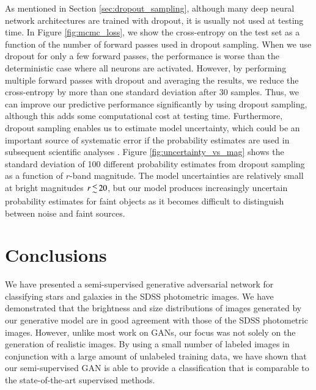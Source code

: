 \documentclass[fleqn,usenatbib]{mnras}
\begin{document}
As mentioned in Section \ref{sec:dropout_sampling}, although many deep neural network architectures are trained with dropout,
it is usually not used at testing time.
In Figure \ref{fig:mcmc_loss}, we show the cross-entropy on the test set as a function of the number of forward passes
used in dropout sampling.
When we use dropout for only a few forward passes, the performance is worse than the deterministic case where all neurons are activated.
However, by performing multiple forward passes with dropout and averaging the results, we reduce the cross-entropy by more than one
standard deviation after 30 samples.
Thus, we can improve our predictive performance significantly by using dropout sampling, although this adds some computational cost
at testing time.
Furthermore, dropout sampling enables us to estimate model uncertainty, which could be an important source of systematic error
if the probability estimates are used in subsequent scientific analyses \citep{ross2011ameliorating}.
Figure \ref{fig:uncertainty_vs_mag} shows the standard deviation of 100 different probability estimates from dropout sampling
as a function of $r$-band magnitude.
The model uncertainties are relatively small at bright magnitudes $r \la 20$, but our model produces increasingly uncertain
probability estimates for faint objects as it becomes difficult to distinguish between noise and faint sources.

\section{Conclusions}
  \label{sec:conclusions}

We have presented a semi-supervised generative adversarial network for classifying stars and galaxies in the SDSS photometric images.
We have demonstrated that the brightness and size distributions of images generated by our generative model
are in good agreement with those of the SDSS photometric images.
However, unlike most work on GANs, our focus was not solely on the generation of realistic images.
By using a small number of labeled images in conjunction with a large amount of unlabeled training data,
we have shown that our semi-supervised GAN is able to provide a classification that is comparable to the state-of-the-art
supervised methods.
\end{document}

